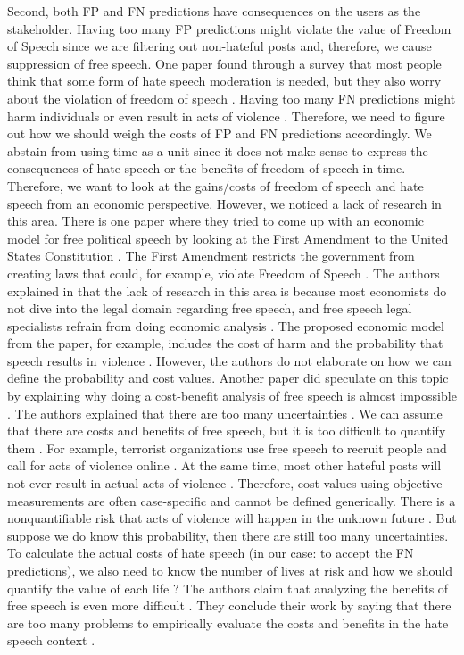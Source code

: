 Second, both FP and FN predictions have consequences on the users as the stakeholder. Having too many FP predictions might violate the value of Freedom of Speech since we are filtering out non-hateful posts and, therefore, we cause suppression of free speech. One paper found through a survey that most people think that some form of hate speech moderation is needed, but they also worry about the violation of freedom of speech \cite{olteanu2017limits}. Having too many FN predictions might harm individuals or even result in acts of violence \cite{ecri-hate-speech-and-violence}. Therefore, we need to figure out how we should weigh the costs of FP and FN predictions accordingly. We abstain from using time as a unit since it does not make sense to express the consequences of hate speech or the benefits of freedom of speech in time. Therefore, we want to look at the gains/costs of freedom of speech and hate speech from an economic perspective. However, we noticed a lack of research in this area. There is one paper where they tried to come up with an economic model for free political speech by looking at the First Amendment to the United States Constitution \cite{posner1986free}. The First Amendment restricts the government from creating laws that could, for example, violate Freedom of Speech \cite{first-amendment-white-house}. The authors explained in \cite{posner1986free} that the lack of research in this area is because most economists do not dive into the legal domain regarding free speech, and free speech legal specialists refrain from doing economic analysis \cite{posner1986free}. The proposed economic model from the paper, for example, includes the cost of harm and the probability that speech results in violence \cite{posner1986free}. However, the authors do not elaborate on how we can define the probability and cost values. Another paper did speculate on this topic by explaining why doing a cost-benefit analysis of free speech is almost impossible \cite{sunstein2018does}. The authors explained that there are too many uncertainties \cite{sunstein2018does}. We can assume that there are costs and benefits of free speech, but it is too difficult to quantify them \cite{sunstein2018does}. For example, terrorist organizations use free speech to recruit people and call for acts of violence online \cite{sunstein2018does}. At the same time, most other hateful posts will not ever result in actual acts of violence \cite{sunstein2018does}. Therefore, cost values using objective measurements are often case-specific and cannot be defined generically. There is a nonquantifiable risk that acts of violence will happen in the unknown future \cite{sunstein2018does}. But suppose we do know this probability, then there are still too many uncertainties. To calculate the actual costs of hate speech (in our case: to accept the FN predictions), we also need to know the number of lives at risk and how we should quantify the value of each life \cite{sunstein2018does}? The authors claim that analyzing the benefits of free speech is even more difficult \cite{sunstein2018does}. They conclude their work by saying that there are too many problems to empirically evaluate the costs and benefits in the hate speech context \cite{sunstein2018does}.

